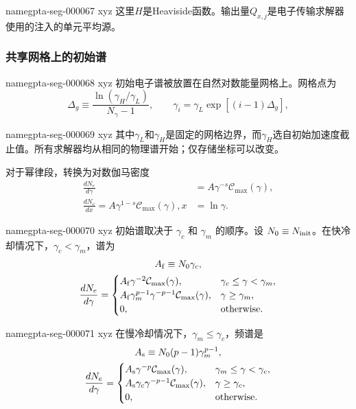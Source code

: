 \documentclass[twocolumn]{aastex702}
\makeatletter
\providecommand{\gptareaderanchor}[1]{\pdfdest name{#1} xyz}%
\providecommand{\gptareaderanchor}[1]{\special{pdf:dest (#1) [ @thispage /XYZ @xpos @ypos null ]}}%
\makeatother
\begin{document}
\gptareaderanchor{gpta-seg-000067}%
这里\(H\)是Heaviside函数。输出量\(Q_{x,j}\)是电子传输求解器使用的注入的单元平均源。

\subsubsection{共享网格上的初始谱}


\gptareaderanchor{gpta-seg-000068}%
初始电子谱被放置在自然对数能量网格上。网格点为
\begin{equation}
\Delta_g\equiv \frac{\ln(\gamma_H/\gamma_L)}{N_\gamma-1},
\qquad
\gamma_i=\gamma_L\exp[(i-1)\Delta_g],
\end{equation}

\gptareaderanchor{gpta-seg-000069}%
其中\(\gamma_L\)和\(\gamma_H\)是固定的网格边界，而\(\gamma_H\)选自初始加速度截止值。所有求解器均从相同的物理谱开始；仅存储坐标可以改变。

对于幂律段，转换为对数伽马密度
\begin{equation}
\begin{aligned}
\frac{dN_e}{d\gamma}
&=A\gamma^{-s}\mathcal{C}_{\max}(\gamma),\\
\frac{dN_e}{dx}=A\gamma^{1-s}\mathcal{C}_{\max}(\gamma),
x&=\ln\gamma .
\end{aligned}
\end{equation}

\gptareaderanchor{gpta-seg-000070}%
初始谱取决于 \(\gamma_c\) 和 \(\gamma_m\) 的顺序。设 \(N_0\equiv N_{\rm init}\)。在快冷却情况下，\(\gamma_c<\gamma_m\)，谱为
\begin{equation}
\begin{gathered}
A_{\rm f}\equiv N_0\gamma_c,\\
\frac{dN_e}{d\gamma}=
\begin{cases}
A_{\rm f}\gamma^{-2}\mathcal{C}_{\max}(\gamma),
& \gamma_c\le\gamma<\gamma_m,\\
A_{\rm f}\gamma_m^{p-1}\gamma^{-p-1}
\mathcal{C}_{\max}(\gamma),
& \gamma\ge\gamma_m,\\
0, & \text{otherwise}.
\end{cases}
\end{gathered}
\end{equation}

\gptareaderanchor{gpta-seg-000071}%
在慢冷却情况下，\(\gamma_m\le\gamma_c\)，频谱是
\begin{equation}
\begin{gathered}
A_{\rm s}\equiv N_0(p-1)\gamma_m^{p-1},\\
\frac{dN_e}{d\gamma}=
\begin{cases}
A_{\rm s}\gamma^{-p}
\mathcal{C}_{\max}(\gamma),
& \gamma_m\le\gamma<\gamma_c,\\
A_{\rm s}\gamma_c\gamma^{-p-1}
\mathcal{C}_{\max}(\gamma),
& \gamma\ge\gamma_c,\\
0, & \text{otherwise}.
\end{cases}
\end{gathered}
\end{equation}
\end{document}
